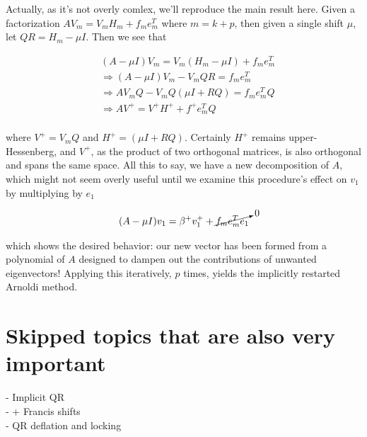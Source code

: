 \documentclass[11pt]{article}
\begin{document}
Actually, as it's not overly comlex, we'll reproduce the main result here. Given a factorization $A V_m = V_m H_m + f_m e_m^T$ where $m = k+p$, then given a single shift $\mu$, let $QR = H_m - \mu I$. Then we see that 

\begin{align*}
  &(A - \mu I)V_m =  V_m (H_m - \mu I) + f_m e_m^T \\
  &\Rightarrow (A - \mu I)V_m - V_m QR = f_m e_m^T \\
  &\Rightarrow AV_mQ - V_m Q(\mu I + RQ) = f_m e_m^T Q \\
  &\Rightarrow A V^+ = V^+ H^+ + f^+ e_m^T Q \\
\end{align*}  

where $V^+ = V_m Q$ and $H^+ = (\mu I + RQ)$. Certainly $H^+$ remains upper-Hessenberg, and $V^+$, as the product of two orthogonal matrices, is also orthogonal and spans the same space. All this to say, we have a new decomposition of $A$, which might not seem overly useful until we examine this procedure's effect on $v_1$ by multiplying by $e_1$

\begin{align*}
  (A - \mu I) v_1 &= \beta^+ v_1^+ + \cancelto{0}{f_m e_m^T e_1} \\
\end{align*}

which shows the desired behavior: our new vector has been formed from a polynomial of $A$ designed to dampen out the contributions of unwanted eigenvectors! Applying this iteratively, $p$ times, yields the implicitly restarted Arnoldi method. 

\section{Skipped topics that are also very important}

- Implicit QR \\
-  +  Francis shifts \\
- QR deflation and locking \\
\end{document}
